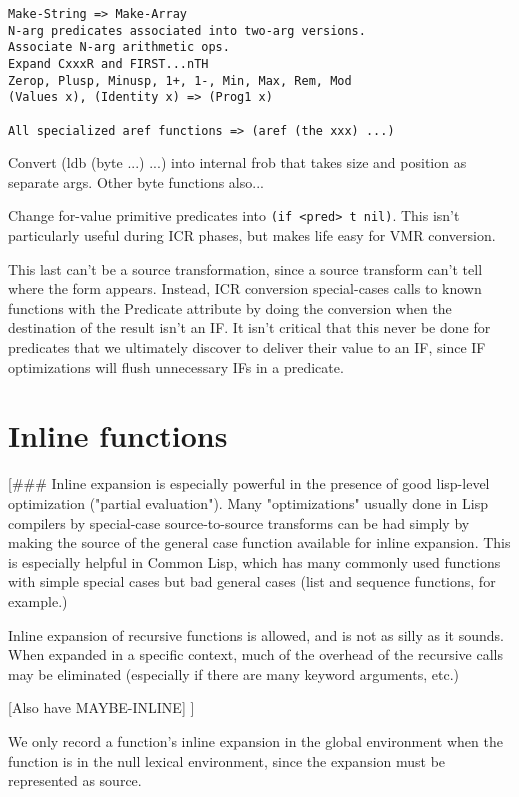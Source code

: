 \begin{verbatim}
Make-String => Make-Array
N-arg predicates associated into two-arg versions.
Associate N-arg arithmetic ops.
Expand CxxxR and FIRST...nTH
Zerop, Plusp, Minusp, 1+, 1-, Min, Max, Rem, Mod
(Values x), (Identity x) => (Prog1 x)

All specialized aref functions => (aref (the xxx) ...)
\end{verbatim}

Convert (ldb (byte ...) ...) into internal frob that takes size and position as
separate args.  Other byte functions also...

Change for-value primitive predicates into \verb+(if <pred> t nil)+.  This isn't
particularly useful during ICR phases, but makes life easy for VMR conversion.


This last can't be a source transformation, since a source transform can't tell
where the form appears.  Instead, ICR conversion special-cases calls to known
functions with the Predicate attribute by doing the conversion when the
destination of the result isn't an IF.  It isn't critical that this never be
done for predicates that we ultimately discover to deliver their value to an
IF, since IF optimizations will flush unnecessary IFs in a predicate.


\section{Inline functions}

[\#\#\# Inline expansion is especially powerful in the presence of good lisp-level
optimization ("partial evaluation").  Many "optimizations" usually done in Lisp
compilers by special-case source-to-source transforms can be had simply by
making the source of the general case function available for inline expansion.
This is especially helpful in Common Lisp, which has many commonly used
functions with simple special cases but bad general cases (list and sequence
functions, for example.)

Inline expansion of recursive functions is allowed, and is not as silly as it
sounds.  When expanded in a specific context, much of the overhead of the
recursive calls may be eliminated (especially if there are many keyword
arguments, etc.)

[Also have MAYBE-INLINE]
]

We only record a function's inline expansion in the global environment when the
function is in the null lexical environment, since the expansion must be
represented as source.

